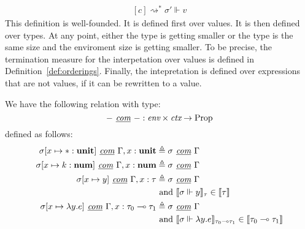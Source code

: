 \begin{definition}
\begin{equation}
\begin{aligned}[c]
{    \rightsquigarrow^* \sigma' \Vdash v}
  \end{aligned}
  \end{equation}
  This definition is well-founded. It is defined first over values. It is then
  defined over types. At any point, either the type is getting smaller or the
  type is the same size and the enviroment size is getting smaller. To be
  precise, the termination measure for the interpetation over values is defined
  in Definition~\ref{def:orderings}. Finally, the intepretation is defined over
  expressions that are not values, if it can be rewritten to a value.
\end{definition}

\begin{definition}
  We have the following relation with type:
  $$- \textit{ \underline{com} } - : \textit{env} \times \textit{ctx} \to
  \text{Prop}$$ 
  defined as follows:
  \begin{equation}
    \begin{normalsize}
    \begin{aligned}[c] 
      \sigma[x \mapsto * : \textbf{unit}] \textit{ \underline{com} } \Gamma, x:
      \textbf{unit} &\triangleq \sigma \textit{ \underline{com} } \Gamma \\
      \sigma[x \mapsto k : \textbf{num}] \textit{ \underline{com} } \Gamma, x:
      \textbf{num} &\triangleq \sigma \textit{ \underline{com} } \Gamma \\
      \sigma[x \mapsto y] \textit{ \underline{com} } \Gamma, x : \tau
      & \triangleq \sigma \textit{ \underline{com} } \Gamma \\
      & \text{ and } \llbracket \sigma \Vdash y \rrbracket_{\tau} \in \llbracket
      \tau \rrbracket \\
      \sigma[x \mapsto \lambda y . e] \textit{ \underline{com} } \Gamma, x :
      \tau_0 \multimap \tau_1 &\triangleq 
      \sigma \textit{ \underline{com} } \Gamma \\ 
      & \text{ and } \llbracket \sigma \Vdash \lambda y . e \rrbracket_{\tau_0
        \multimap \tau_1} \in \llbracket \tau_0 \multimap \tau_1 \rrbracket

\end{aligned}
\end{normalsize}
\end{equation}
\end{definition}
